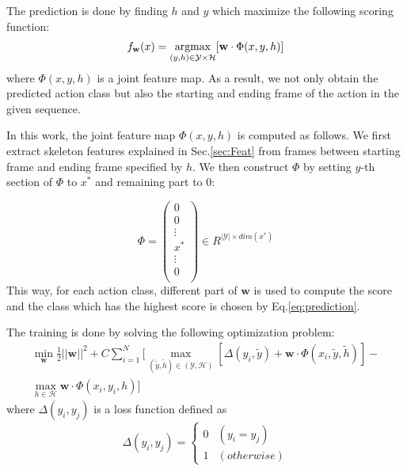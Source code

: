 \documentclass[10pt,twocolumn,letterpaper]{article}
\newcommand{\argmax}{\operatornamewithlimits{argmax}}
\begin{document}
The prediction is done by finding $h$ and $y$ which maximize the following scoring function:
\begin{align}\label{eq:prediction}
f_{\mathbf{w}}(x) = \argmax_{(y,h) \in \mathcal{Y} \times \mathcal{H}} [ \mathbf{w} \cdot \Phi(x,y,h)]
\end{align}
where $\Phi(x,y,h)$ is a joint feature map. As a result, we not only obtain the predicted action class but also the starting and ending frame of the action in the given sequence.

In this work, the joint feature map $\Phi(x,y,h)$ is computed as follows. We first extract skeleton features explained in Sec.\ref{sec:Feat} from frames between starting frame and ending frame specified by $h$. We then construct $\Phi$ by setting $y$-th section of $\Phi$ to $x^{*}$ and remaining part to 0:

\begin{equation}\label{M}
\Phi =
\begin{pmatrix}
  0  \\
  0  \\
  \vdots \\
  x^* \\
  \vdots \\
    0   \\
\end{pmatrix}
\in R^{ |\mathcal{Y}| \times dim(x^*)}
\end{equation}
This way, for each action class, different part of $\mathbf{w}$ is used to compute the score and the class which has the highest score is chosen by Eq.\ref{eq:prediction}.

The training is done by solving the following optimization problem:
\begin{equation}\label{eq:optimization}
\begin{aligned}
\min_{\mathbf{w}} \frac{1}{2} ||\mathbf{w} ||^2 + C \sum_{i=1}^{N} [ \max_{ (\tilde{y},\tilde{h}) \in (\mathcal{Y},\mathcal{H}) } [ \Delta(y_i, \tilde{y}) + \mathbf{w} \cdot \Phi(x_i, \tilde{y}, \tilde{h} )] - \\
\max_{h \in \mathcal{H}}  \mathbf{w} \cdot \Phi(x_i,y_i, h)]
\end{aligned}
\end{equation}
where $\Delta(y_i,y_j)$  is a loss function defined as
\[
  \Delta(y_i,y_j) = \begin{cases}
    0 & (y_i = y_j ) \\
    1 & (otherwise)
  \end{cases}
\]
\end{document}
